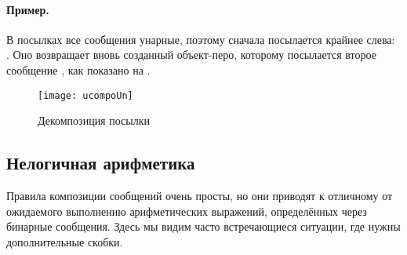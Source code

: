 \documentclass[a4paper,10pt,twoside]{book}
\begin{document}


\paragraph{Пример.} В посылках  все сообщения унарные, поэтому сначала посылается крайнее слева: . Оно возвращает вновь созданный объект-перо, которому посылается второе сообщение , как показано на .

\begin{figure}
	\centering
	\texttt{[image: ucompoUn]}
	\caption{Декомпозиция посылки }
\end{figure}

\subsection{Нелогичная арифметика}
Правила композиции сообщений очень просты, но они приводят к отличному от ожидаемого выполнению арифметических выражений, определённых через бинарные сообщения. Здесь мы видим часто встречающиеся ситуации, где нужны дополнительные скобки.
\end{document}
